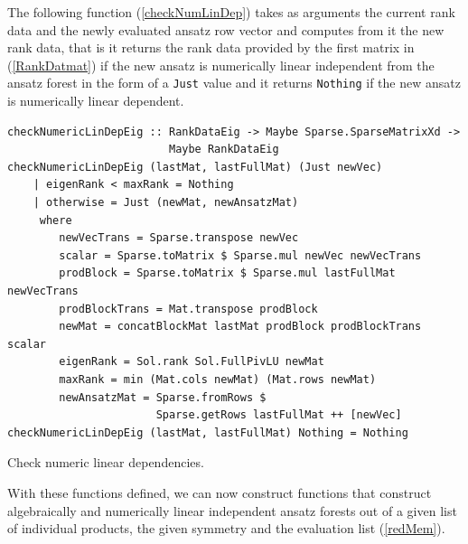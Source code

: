 \documentclass[a4paper,12pt, DIV=14, BCOR=5mm, twoside, headsepline, numbers=noenddot]{scrbook}
\begin{document}
The following function (\ref{checkNumLinDep}) takes as arguments the current rank data and the newly evaluated ansatz row vector and computes from it the new rank data, that is it returns the rank data provided by the first matrix in (\ref{RankDatmat}) if the new ansatz is numerically linear independent from the ansatz forest in the form of a \texttt{Just} value and it returns \texttt{Nothing} if the new ansatz is numerically linear dependent. 

\begin{listing}[hbt!]
\begin{verbatim}
checkNumericLinDepEig :: RankDataEig -> Maybe Sparse.SparseMatrixXd ->
                         Maybe RankDataEig
checkNumericLinDepEig (lastMat, lastFullMat) (Just newVec)
    | eigenRank < maxRank = Nothing
    | otherwise = Just (newMat, newAnsatzMat)
     where
        newVecTrans = Sparse.transpose newVec
        scalar = Sparse.toMatrix $ Sparse.mul newVec newVecTrans
        prodBlock = Sparse.toMatrix $ Sparse.mul lastFullMat newVecTrans
        prodBlockTrans = Mat.transpose prodBlock
        newMat = concatBlockMat lastMat prodBlock prodBlockTrans scalar
        eigenRank = Sol.rank Sol.FullPivLU newMat
        maxRank = min (Mat.cols newMat) (Mat.rows newMat)
        newAnsatzMat = Sparse.fromRows $ 
                       Sparse.getRows lastFullMat ++ [newVec]
checkNumericLinDepEig (lastMat, lastFullMat) Nothing = Nothing
\end{verbatim} 
\caption{Check numeric linear dependencies.}\label{checkNumLinDep}
\end{listing}

With these functions defined, we can now construct functions that construct algebraically and numerically linear independent ansatz forests out of a given list of individual products, the given symmetry and the evaluation list (\ref{redMem}).
\end{document}
